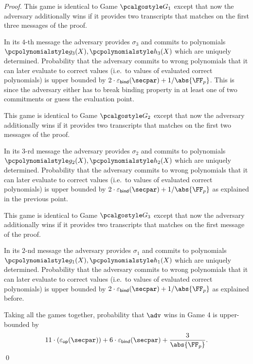 {\begin{proof}
   This game is identical to Game $\game{1}$ except that now the
  adversary additionally wins if it provides two transcripts that matches on the
  first three messages of the proof.

   In its $4$-th message the adversary
  provides $\sigma_3$ and commits to polynomials $\p{g_3} (X), \p{h_3} (X)$ which are
  uniquely determined. Probability that the adversary commits to wrong polynomials that it
  can later evaluate to correct values (i.e.~to values of evaluated correct polynomials)
  is upper bounded by $2 \cdot \epsbind (\secpar) + 1 / \abs{\FF_p}$. This is since the
  adversary either has to break binding property in at least one of two commitments or
  guess the evaluation point.

   This game is identical to Game $\game{2}$ except that now the
  adversary additionally wins if it provides two transcripts that matches on the
  first two messages of the proof.

   In its $3$-rd message the adversary
  provides $\sigma_2$ and commits to polynomials $\p{g_2} (X), \p{h_2} (X)$ which are
  uniquely determined. Probability that the adversary commits to wrong polynomials that it
  can later evaluate to correct values (i.e.~to values of evaluated correct polynomials)
  is upper bounded by $2 \cdot \epsbind (\secpar) + 1 / \abs{\FF_p}$ as explained in the
  previous point.

    This game is identical to Game $\game{3}$ except that now the
  adversary additionally wins if it provides two transcripts that matches on the
  first message of the proof.

   In its $2$-nd message the adversary
  provides $\sigma_1$ and commits to polynomials $\p{g_1} (X), \p{h_1} (X)$ which are
  uniquely determined. Probability that the adversary commits to wrong polynomials that it
  can later evaluate to correct values (i.e.~to values of evaluated correct polynomials)
  is upper bounded by $2 \cdot \epsbind (\secpar) + 1 / \abs{\FF_p}$ as explained before.
  
   Taking all the games together, probability that $\adv$ wins
  in Game 4 is upper-bounded by
  \[
    11 \cdot (\epsop (\secpar)) + 6 \cdot \epsbind (\secpar) + \frac{3}{\abs{\FF_p}}.
  \]
  \qed
\end{proof}
}


